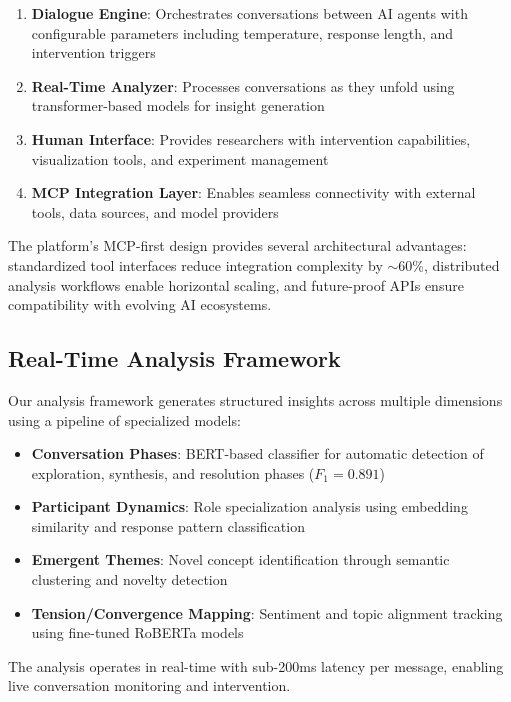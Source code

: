 \documentclass{article}
\newcommand{\mcp}{\textsc{MCP}}
\begin{document}
\begin{enumerate}
    \item \textbf{Dialogue Engine}: Orchestrates conversations between AI agents with configurable parameters including temperature, response length, and intervention triggers
    \item \textbf{Real-Time Analyzer}: Processes conversations as they unfold using transformer-based models for insight generation
    \item \textbf{Human Interface}: Provides researchers with intervention capabilities, visualization tools, and experiment management
    \item \textbf{\mcp{} Integration Layer}: Enables seamless connectivity with external tools, data sources, and model providers
\end{enumerate}

The platform's \mcp{}-first design provides several architectural advantages: standardized tool interfaces reduce integration complexity by $\sim$60\%, distributed analysis workflows enable horizontal scaling, and future-proof APIs ensure compatibility with evolving AI ecosystems.

\subsection{Real-Time Analysis Framework}

Our analysis framework generates structured insights across multiple dimensions using a pipeline of specialized models:

\begin{itemize}
    \item \textbf{Conversation Phases}: BERT-based classifier for automatic detection of exploration, synthesis, and resolution phases ($F_1 = 0.891$)
    \item \textbf{Participant Dynamics}: Role specialization analysis using embedding similarity and response pattern classification
    \item \textbf{Emergent Themes}: Novel concept identification through semantic clustering and novelty detection
    \item \textbf{Tension/Convergence Mapping}: Sentiment and topic alignment tracking using fine-tuned RoBERTa models
\end{itemize}

The analysis operates in real-time with sub-200ms latency per message, enabling live conversation monitoring and intervention.
\end{document}
